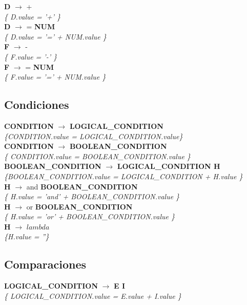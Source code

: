 \documentclass[10pt,a4paper]{article}
\begin{document}
\textbf{D} $\rightarrow$ +   \\
\textit{\{ D.value = '+'  \}} \\

\textbf{D} $\rightarrow$ = \textbf{NUM} \\
\textit{\{ D.value =  '=' + NUM.value  \}} \\

\textbf{F} $\rightarrow$ - \\
\textit{\{ F.value = '-'  \}} \\

\textbf{F} $\rightarrow$ = \textbf{NUM} \\
\textit{\{ F.value =  '=' + NUM.value  \}} \\

\subsection{Condiciones}
\textbf{CONDITION} $\rightarrow$ \textbf{LOGICAL\_CONDITION}   \\
\textit{\{CONDITION.value = LOGICAL\_CONDITION.value\}}\\

\textbf{CONDITION} $\rightarrow$ \textbf{BOOLEAN\_CONDITION} \\
\textit{\{ CONDITION.value = BOOLEAN\_CONDITION.value  \}} \\

\textbf{BOOLEAN\_CONDITION} $\rightarrow$ \textbf{LOGICAL\_CONDITION H} \\
\textit{\{BOOLEAN\_CONDITION.value = LOGICAL\_CONDITION + H.value   \}} \\

\textbf{H} $\rightarrow$ and \textbf{BOOLEAN\_CONDITION} \\
\textit{\{ H.value = 'and' + BOOLEAN\_CONDITION.value   \}} \\

\textbf{H} $\rightarrow$ or \textbf{BOOLEAN\_CONDITION} \\
\textit{\{ H.value = 'or' + BOOLEAN\_CONDITION.value   \}} \\

\textbf{H} $\rightarrow$ $lambda$ \\
\textit{\{H.value = ''\}} \\

\subsection{Comparaciones}
\textbf{LOGICAL\_CONDITION} $\rightarrow$ \textbf{E I} \\
\textit{\{ LOGICAL\_CONDITION.value = E.value + I.value   \}} \\
\end{document}
